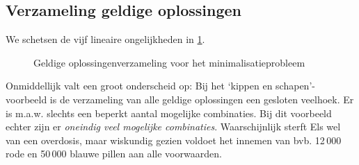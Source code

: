 \subsection{Verzameling geldige oplossingen}
We schetsen  de vijf lineaire ongelijkheden  in 
\cref{fig:minoplverz}. 
\begin{figure}[tbp]
    \centering
{}
    \caption{Geldige oplossingenverzameling voor het
    minimalisatieprobleem}
    \label{fig:minoplverz}
\end{figure}

Onmiddellijk valt een groot onderscheid op: Bij het `kippen en
schapen'-voorbeeld is de verzameling van alle geldige oplossingen
een gesloten veelhoek. Er is m.a.w. slechts een beperkt aantal
mogelijke combinaties. Bij dit voorbeeld echter zijn er \emph{oneindig
veel mogelijke combinaties}. Waarschijnlijk sterft Els wel van
een overdosis, maar wiskundig gezien voldoet het innemen van
bvb. 12\,000 rode en 50\,000 blauwe pillen aan alle voorwaarden.



